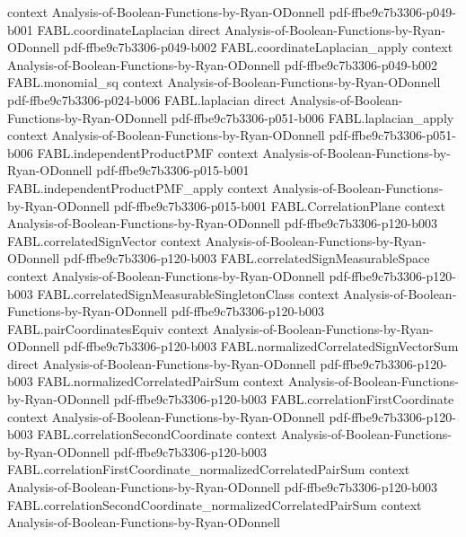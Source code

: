\begin{theorem}
  {context}
  {Analysis-of-Boolean-Functions-by-Ryan-ODonnell}
  {pdf-ffbe9c7b3306-p049-b001}
\proofstep
  {FABL.coordinateLaplacian}
  {direct}
  {Analysis-of-Boolean-Functions-by-Ryan-ODonnell}
  {pdf-ffbe9c7b3306-p049-b002}
\proofstep
  {FABL.coordinateLaplacian_apply}
  {context}
  {Analysis-of-Boolean-Functions-by-Ryan-ODonnell}
  {pdf-ffbe9c7b3306-p049-b002}
\proofstep
  {FABL.monomial_sq}
  {context}
  {Analysis-of-Boolean-Functions-by-Ryan-ODonnell}
  {pdf-ffbe9c7b3306-p024-b006}
\proofstep
  {FABL.laplacian}
  {direct}
  {Analysis-of-Boolean-Functions-by-Ryan-ODonnell}
  {pdf-ffbe9c7b3306-p051-b006}
\proofstep
  {FABL.laplacian_apply}
  {context}
  {Analysis-of-Boolean-Functions-by-Ryan-ODonnell}
  {pdf-ffbe9c7b3306-p051-b006}
\proofstep
  {FABL.independentProductPMF}
  {context}
  {Analysis-of-Boolean-Functions-by-Ryan-ODonnell}
  {pdf-ffbe9c7b3306-p015-b001}
\proofstep
  {FABL.independentProductPMF_apply}
  {context}
  {Analysis-of-Boolean-Functions-by-Ryan-ODonnell}
  {pdf-ffbe9c7b3306-p015-b001}
\proofstep
  {FABL.CorrelationPlane}
  {context}
  {Analysis-of-Boolean-Functions-by-Ryan-ODonnell}
  {pdf-ffbe9c7b3306-p120-b003}
\proofstep
  {FABL.correlatedSignVector}
  {context}
  {Analysis-of-Boolean-Functions-by-Ryan-ODonnell}
  {pdf-ffbe9c7b3306-p120-b003}
\proofstep
  {FABL.correlatedSignMeasurableSpace}
  {context}
  {Analysis-of-Boolean-Functions-by-Ryan-ODonnell}
  {pdf-ffbe9c7b3306-p120-b003}
\proofstep
  {FABL.correlatedSignMeasurableSingletonClass}
  {context}
  {Analysis-of-Boolean-Functions-by-Ryan-ODonnell}
  {pdf-ffbe9c7b3306-p120-b003}
\proofstep
  {FABL.pairCoordinatesEquiv}
  {context}
  {Analysis-of-Boolean-Functions-by-Ryan-ODonnell}
  {pdf-ffbe9c7b3306-p120-b003}
\proofstep
  {FABL.normalizedCorrelatedSignVectorSum}
  {direct}
  {Analysis-of-Boolean-Functions-by-Ryan-ODonnell}
  {pdf-ffbe9c7b3306-p120-b003}
\proofstep
  {FABL.normalizedCorrelatedPairSum}
  {context}
  {Analysis-of-Boolean-Functions-by-Ryan-ODonnell}
  {pdf-ffbe9c7b3306-p120-b003}
\proofstep
  {FABL.correlationFirstCoordinate}
  {context}
  {Analysis-of-Boolean-Functions-by-Ryan-ODonnell}
  {pdf-ffbe9c7b3306-p120-b003}
\proofstep
  {FABL.correlationSecondCoordinate}
  {context}
  {Analysis-of-Boolean-Functions-by-Ryan-ODonnell}
  {pdf-ffbe9c7b3306-p120-b003}
\proofstep
  {FABL.correlationFirstCoordinate_normalizedCorrelatedPairSum}
  {context}
  {Analysis-of-Boolean-Functions-by-Ryan-ODonnell}
  {pdf-ffbe9c7b3306-p120-b003}
\proofstep
  {FABL.correlationSecondCoordinate_normalizedCorrelatedPairSum}
  {context}
  {Analysis-of-Boolean-Functions-by-Ryan-ODonnell}

\end{theorem}
